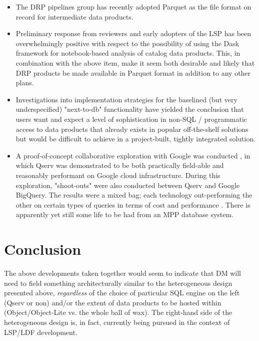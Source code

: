 \begin{itemize}

\item The DRP pipelines group has recently adopted Parquet as the file format on record for intermediate data products.

\item Preliminary response from reviewers and early adopters of the LSP has been overwhelmingly positive with respect to the possibility of using the Dask framework for notebook-based analysis of catalog data products.  This, in combination with the above item, make it seem both desirable and likely that DRP products be made available in Parquet format in addition to any other plans.

\item Investigations into implementation strategies for the baselined (but very underspecified) "next-to-db" functionality have yielded the conclusion that users want and expect a level of sophistication in non-SQL / programmatic access to data products that already exists in popular off-the-shelf solutions but would be difficult to achieve in a project-built, tightly integrated solution.

\item A proof-of-concept collaborative exploration with Google was conducted , in which Qserv was demonstrated to be both practically field-able and reasonably performant on Google cloud infrastructure.  During this exploration, "shoot-outs" were also conducted between Qserv and Google BigQuery. The results were a mixed bag; each technology out-performing the other on certain types of queries in terms of cost and performance . There is apparently yet still some life to be had from an MPP database system.

\end{itemize}

\section {Conclusion}

The above developments taken together would seem to indicate that DM will need to field something architecturally similar to the heterogeneous design presented above, \textit{regardless} of the choice of particular SQL engine on the left (Qserv or non) and/or the extent of data products to be hosted within (Object/Object-Lite vs. the whole ball of wax).  The right-hand side of the heterogeneous design is, in fact, currently being pursued in the context of LSP/LDF development.

